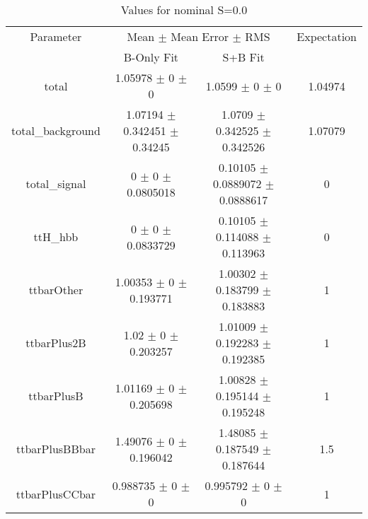 \begin{table}
\centering
\caption{Values for nominal S=0.0}
\begin{tabular}{cccc}
\toprule
Parameter & \multicolumn{2}{c}{Mean $\pm$ Mean Error $\pm$ RMS} & Expectation\\
 & B-Only Fit & S+B Fit & \\
\midrule
total & \num{1.05978} $\pm$ \num{0} $\pm$ \num{0} & \num{1.0599} $\pm$ \num{0} $\pm$ \num{0} & \num{1.04974}\\
total\_background & \num{1.07194} $\pm$ \num{0.342451} $\pm$ \num{0.34245} & \num{1.0709} $\pm$ \num{0.342525} $\pm$ \num{0.342526} & \num{1.07079}\\
total\_signal & \num{0} $\pm$ \num{0} $\pm$ \num{0.0805018} & \num{0.10105} $\pm$ \num{0.0889072} $\pm$ \num{0.0888617} & \num{0}\\
ttH\_hbb & \num{0} $\pm$ \num{0} $\pm$ \num{0.0833729} & \num{0.10105} $\pm$ \num{0.114088} $\pm$ \num{0.113963} & \num{0}\\
ttbarOther & \num{1.00353} $\pm$ \num{0} $\pm$ \num{0.193771} & \num{1.00302} $\pm$ \num{0.183799} $\pm$ \num{0.183883} & \num{1}\\
ttbarPlus2B & \num{1.02} $\pm$ \num{0} $\pm$ \num{0.203257} & \num{1.01009} $\pm$ \num{0.192283} $\pm$ \num{0.192385} & \num{1}\\
ttbarPlusB & \num{1.01169} $\pm$ \num{0} $\pm$ \num{0.205698} & \num{1.00828} $\pm$ \num{0.195144} $\pm$ \num{0.195248} & \num{1}\\
ttbarPlusBBbar & \num{1.49076} $\pm$ \num{0} $\pm$ \num{0.196042} & \num{1.48085} $\pm$ \num{0.187549} $\pm$ \num{0.187644} & \num{1.5}\\
ttbarPlusCCbar & \num{0.988735} $\pm$ \num{0} $\pm$ \num{0} & \num{0.995792} $\pm$ \num{0} $\pm$ \num{0} & \num{1}\\
\bottomrule
\end{tabular}
\end{table}